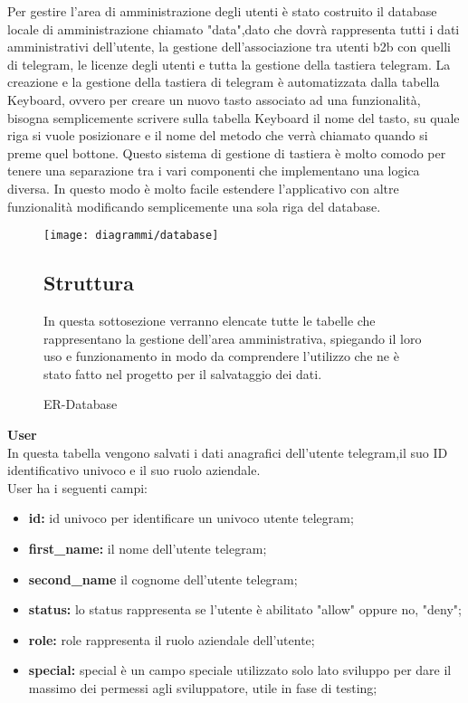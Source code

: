 Per gestire l'area di amministrazione degli utenti è stato costruito il database locale di amministrazione chiamato "data",dato che dovrà rappresenta tutti i dati amministrativi dell'utente, la gestione dell'associazione tra utenti b2b con quelli di telegram, le licenze degli utenti e tutta la gestione della tastiera telegram. La creazione e la  gestione della tastiera di telegram è automatizzata dalla tabella Keyboard, ovvero per creare un nuovo tasto associato ad una funzionalità, bisogna semplicemente scrivere sulla tabella Keyboard il nome del tasto, su quale riga si vuole posizionare e il nome del metodo che verrà chiamato quando si preme quel bottone. Questo sistema di gestione di tastiera è molto comodo per tenere una separazione tra i vari componenti che implementano una logica diversa. In questo modo è molto facile estendere l'applicativo con altre funzionalità modificando semplicemente una sola riga del database. 
\clearpage
\begin{figure}[h!]
   \begin{center}
     \texttt{[image: diagrammi/database]} 
    \caption{ER-Database }
    \end{center}

\subsection{Struttura}
In questa sottosezione verranno elencate tutte le tabelle che rappresentano la gestione dell'area amministrativa, spiegando il loro uso e funzionamento in modo da comprendere l'utilizzo che ne è stato fatto nel progetto per il salvataggio dei dati. \\
\end{figure}


\textbf{User} \\ 

In questa tabella vengono salvati i dati anagrafici dell'utente telegram,il suo ID identificativo univoco e il suo ruolo aziendale. \\

User ha i seguenti campi: \\ 
\begin{itemize}
\item \textbf{id:}  id univoco per identificare un univoco utente telegram;
\item \textbf{first\_name:} il nome dell'utente telegram;
\item \textbf{second\_name } il cognome dell'utente telegram;
\item \textbf{status:} lo status rappresenta se l'utente è abilitato "allow" oppure no, "deny";
\item \textbf{role:} role rappresenta il ruolo aziendale dell'utente;
\item \textbf{special:} special è un campo speciale utilizzato solo lato sviluppo per dare il massimo dei  permessi agli sviluppatore, utile in fase di testing;
\end{itemize}


